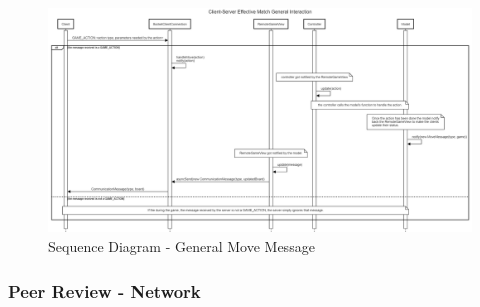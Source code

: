 \documentclass[a4paper, 12pt]{article}
\begin{document}
	\begin{figure}[h!]
		\centering
		\includegraphics[scale=0.25]{ClientServerEffectiveMatchGeneralInteraction.png}
		\caption{Sequence Diagram - General Move Message}
		\label{fig:sequence_generalmove}
	\end{figure}

	\newpage
	\subsubsection{Peer Review - Network}
\end{document}
